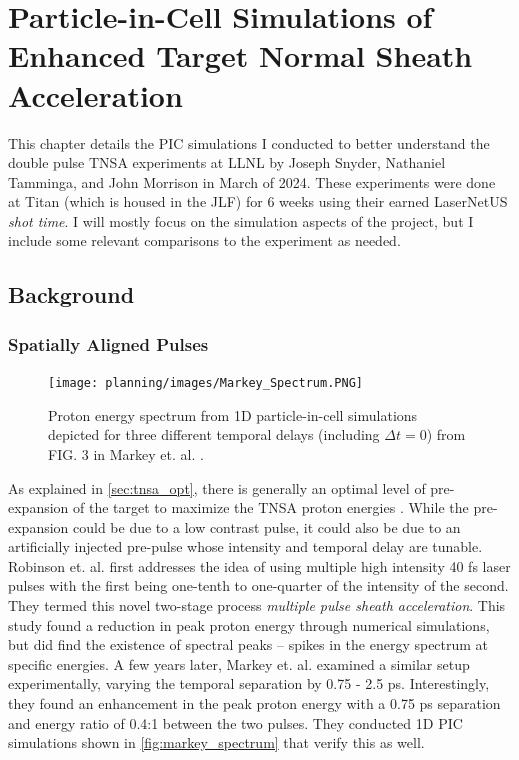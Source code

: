 \chapter{Particle-in-Cell Simulations of Enhanced Target Normal Sheath Acceleration} \label{ch:4}

This chapter details the \gls{PIC} simulations I conducted to better understand the double pulse \gls{TNSA} experiments at \gls{LLNL} by Joseph Snyder, Nathaniel Tamminga, and John Morrison in March of 2024. These experiments were done at Titan (which is housed in the \gls{JLF}) for 6 weeks using their earned LaserNetUS \emph{shot time}. I will mostly focus on the simulation aspects of the project, but I include some relevant comparisons to the experiment as needed. 

\section{Background} \label{sec:etnsa_background}

\subsection{Spatially Aligned Pulses} \label{sec:spatialalign}

\begin{figure}
	\centering 
	\texttt{[image: planning/images/Markey\_Spectrum.PNG]}
	\caption{Proton energy spectrum from 1D particle-in-cell simulations depicted for three different temporal delays (including $\Delta t = 0$) from FIG. 3 in Markey et. al. \cite{Markey_2010_PRL}.}
	\label{fig:markey_spectrum}
\end{figure}

As explained in \autoref{sec:tnsa_opt}, there is generally an optimal level of pre-expansion of the target to maximize the \gls{TNSA} proton energies \cite{McKenna_2008_LaPB,Fuchs_2007_PRL}. While the pre-expansion could be due to a low contrast pulse, it could also be due to an artificially injected pre-pulse whose intensity and temporal delay are tunable. Robinson et. al. \cite{Robinson_2007_PPCF} first addresses the idea of using multiple high intensity 40 fs laser pulses with the first being one-tenth to one-quarter of the intensity of the second. They termed this novel two-stage process \emph{multiple pulse sheath acceleration}. This study found a reduction in peak proton energy through numerical simulations, but did find the existence of spectral peaks -- spikes in the energy spectrum at specific energies. A few years later, Markey et. al. \cite{Markey_2010_PRL} examined a similar setup experimentally, varying the temporal separation by 0.75 - 2.5 ps. Interestingly, they found an enhancement in the peak proton energy with a 0.75 ps separation and energy ratio of 0.4:1 between the two pulses. They conducted 1D \gls{PIC} simulations shown in \autoref{fig:markey_spectrum} that verify this as well.

